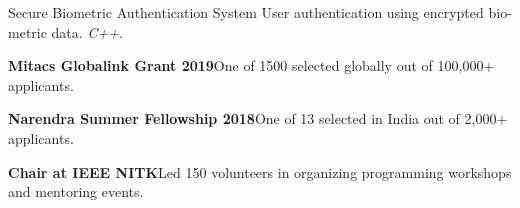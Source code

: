 \documentclass[11pt,a4paper]{article}
\begin{document}
\headedsectiontwo
{Secure Biometric Authentication System}{}{}
{
	User authentication using encrypted bio-metric data. \textit{C++}.
}


\begin{circlist}
	\item \textbf{Mitacs Globalink Grant 2019}\hspace{0.5em}One of 1500 selected globally out of 100,000+ applicants.
	\item \textbf{Narendra Summer Fellowship 2018}\hspace{0.5em}One of 13 selected in India out of 2,000+ applicants.
	\item \textbf{Chair at IEEE NITK}\hspace{0.5em}Led 150 volunteers in organizing programming workshops and mentoring events.
\end{circlist}
\end{document}
